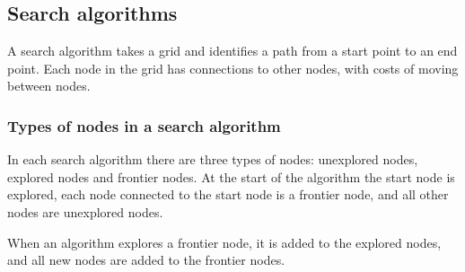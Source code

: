 
\subsection{Search algorithms}

A search algorithm takes a grid and identifies a path from a start point to an end point. Each node in the grid has connections to other nodes, with costs of moving between nodes.

\subsubsection{Types of nodes in a search algorithm}

In each search algorithm there are three types of nodes: unexplored nodes, explored nodes and frontier nodes. At the start of the algorithm the start node is explored, each node connected to the start node is a frontier node, and all other nodes are unexplored nodes.

When an algorithm explores a frontier node, it is added to the explored nodes, and all new nodes are added to the frontier nodes.

